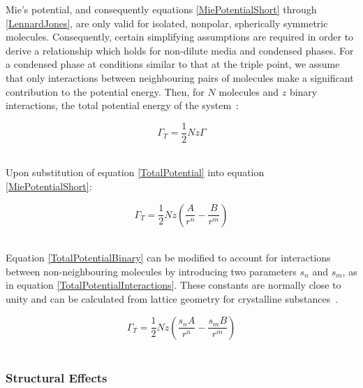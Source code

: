 Mie's potential, and consequently equations \ref{MiePotentialShort} through \ref{LennardJones}, are only valid for isolated, nonpolar, spherically symmetric molecules. Consequently, certain simplifying assumptions are required in order to derive a relationship which holds for non-dilute media and condensed phases. For a condensed phase at conditions similar to that at the triple point, we assume that only interactions between neighbouring pairs of molecules make a significant contribution to the potential energy. Then, for $N$ molecules and $z$ binary interactions, the total potential energy of the system~\cite{MolecularThermodynamicsOfFluidPhaseEquilibria}:\

\begin{equation}
\Gamma_{T} = \frac{1}{2}Nz \Gamma \label{TotalPotential}
\end{equation}\


Upon substitution of equation \ref{TotalPotential} into equation \ref{MiePotentialShort}:\

\begin{equation}
\Gamma_{T} = \frac{1}{2}Nz \left(\frac{A}{r^{n}}-\frac{B}{r^{m}}\right) \label{TotalPotentialBinary}
\end{equation}\

Equation \ref{TotalPotentialBinary} can be modified to account for interactions between non-neighbouring molecules by introducing two parameters $s_{n}$ and $s_{m}$, as in equation \ref{TotalPotentialInteractions}. These constants are normally close to unity and can be calculated from lattice geometry for crystalline substances~\cite{MolecularThermodynamicsOfFluidPhaseEquilibria}.\

\begin{equation}
\Gamma_{T} = \frac{1}{2}Nz \left(\frac{s_{n}A}{r^{n}}-\frac{s_{m}B}{r^{m}}\right) \label{TotalPotentialInteractions}
\end{equation}\


\subsubsection{Structural Effects}\

